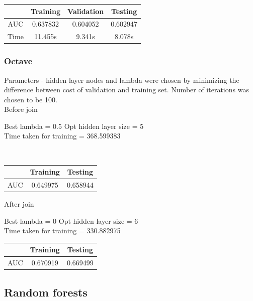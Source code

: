 \documentclass[10pt]{article}
\begin{document}
\begin{center}
 \begin{tabular}{|c | c | c | c||} 
 \hline
 & Training & Validation & Testing\\ [0.5ex] 
 \hline\hline
AUC & 0.637832 & 0.604052 & 0.602947\\
 \hline
Time & 11.455s & 9.341s & 8.078s\\ 
 \hline
\end{tabular}
\end{center}

\subsubsection{Octave}
Parameters - hidden layer nodes and lambda were chosen by minimizing the difference between cost of validation and training set. Number of iterations was chosen to be 100.
\\

Before join

	Best lambda = 0.5 Opt hidden layer size = 5 
\\

	Time taken for training = 368.599383

\\
\begin{center}
 \begin{tabular}{|c | c | c ||} 
 \hline
 & Training & Testing\\ [0.5ex] 
 \hline\hline
AUC & 0.649975 & 0.658944\\
 \hline
\end{tabular}
\end{center}

After join

	Best lambda = 0 Opt hidden layer size = 6 
\\
	Time taken for training = 330.882975
\\
\begin{center}
 \begin{tabular}{|c | c | c ||} 
 \hline
 & Training & Testing\\ [0.5ex] 
 \hline\hline
AUC & 0.670919 & 0.669499\\
 \hline
\end{tabular}
\end{center}


\subsection{Random forests}
\end{document}
